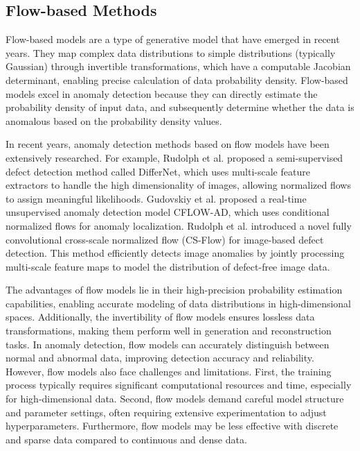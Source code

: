 \documentclass{article}
\begin{document}
\subsection{Flow-based Methods}

Flow-based models are a type of generative model that have emerged in recent years. They map complex data distributions to simple distributions (typically Gaussian) through invertible transformations, which have a computable Jacobian determinant, enabling precise calculation of data probability density. Flow-based models excel in anomaly detection because they can directly estimate the probability density of input data, and subsequently determine whether the data is anomalous based on the probability density values.

In recent years, anomaly detection methods based on flow models have been extensively researched. For example, Rudolph et al.\cite{DifferNet} proposed a semi-supervised defect detection method called DifferNet, which uses multi-scale feature extractors to handle the high dimensionality of images, allowing normalized flows to assign meaningful likelihoods. Gudovskiy et al.\cite{CFlow-AD} proposed a real-time unsupervised anomaly detection model CFLOW-AD, which uses conditional normalized flows for anomaly localization. Rudolph et al.\cite{CSFlow} introduced a novel fully convolutional cross-scale normalized flow (CS-Flow) for image-based defect detection. This method efficiently detects image anomalies by jointly processing multi-scale feature maps to model the distribution of defect-free image data.

The advantages of flow models lie in their high-precision probability estimation capabilities, enabling accurate modeling of data distributions in high-dimensional spaces. Additionally, the invertibility of flow models ensures lossless data transformations, making them perform well in generation and reconstruction tasks. In anomaly detection, flow models can accurately distinguish between normal and abnormal data, improving detection accuracy and reliability. However, flow models also face challenges and limitations. First, the training process typically requires significant computational resources and time, especially for high-dimensional data. Second, flow models demand careful model structure and parameter settings, often requiring extensive experimentation to adjust hyperparameters. Furthermore, flow models may be less effective with discrete and sparse data compared to continuous and dense data.
\end{document}
